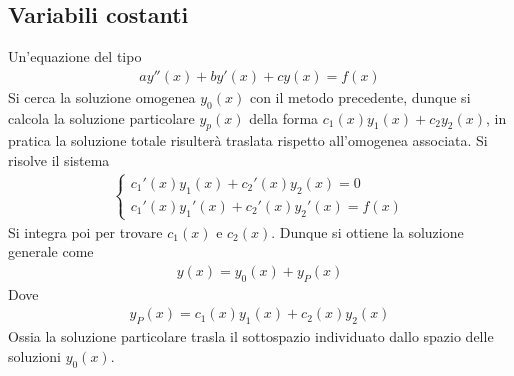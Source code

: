 \documentclass[a4paper, oneside]{book}
\begin{document}
\subsection{Variabili costanti}
Un'equazione del tipo
\begin{gather*}
    ay''(x) + by'(x) + c y(x) = f(x) 
\end{gather*}
Si cerca la soluzione omogenea $y_0(x)$ con il metodo precedente, dunque si calcola
la soluzione particolare $y_p(x)$ della forma $c_1(x)y_1(x) + c_2y_2(x)$, in pratica la soluzione 
totale risulterà traslata rispetto all'omogenea associata. Si risolve il sistema
\begin{gather*}
    \left\{\begin{array}{l}
        c_1'(x) y_1(x) + c_2'(x) y_2(x) = 0 \\
        c_1'(x)y_1'(x) + c_2'(x)y_2'(x) = f(x) 
    \end{array}\right.
\end{gather*}
Si integra poi per trovare $c_1(x)$ e $c_2(x)$. Dunque si ottiene la soluzione generale come 
\begin{gather*}
    y(x) = y_0(x) + y_P(x)
\end{gather*}
Dove 
\begin{gather*}
    y_P(x) = c_1(x)y_1(x) + c_2(x)y_2(x)
\end{gather*}
Ossia la soluzione particolare trasla il sottospazio individuato dallo spazio
delle soluzioni $y_0(x)$. 
\end{document}
